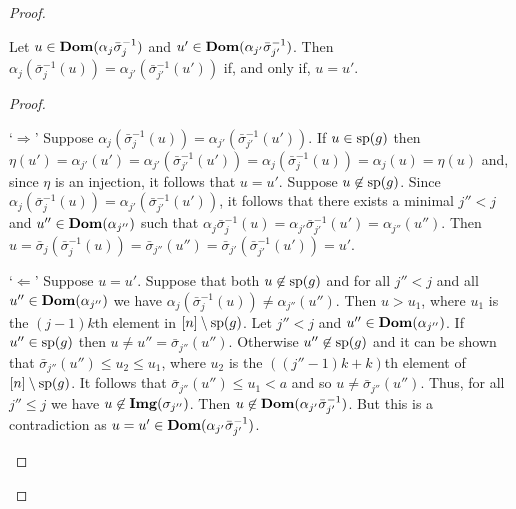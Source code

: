 \documentclass[../main/thesis.tex]{subfiles}
\begin{document}
\begin{proof}
  \begin{claim}
    Let $u \in \text{\textbf{Dom}}(\alpha_j \bar{\sigma}^{-1}_j)$ and $u' \in
    \text{\textbf{Dom}}(\alpha_{j'}\bar{\sigma}^{-1}_{j'})$. Then $\alpha_j
    (\bar{\sigma}^{-1}_j(u)) = \alpha_{j'}(\bar{\sigma}^{-1}_{j'}(u'))$ if, and
    only if, $u = u'$.
    \label{claim:compatibility}
  \end{claim}
  \begin{proof}
    \begin{myenum}
    \item[`$\Rightarrow$'] Suppose $\alpha_j (\bar{\sigma}^{-1}_j(u)) =
      \alpha_{j'}(\bar{\sigma}^{-1}_{j'}(u'))$. If $u \in \text{sp}(g)$ then
      $\eta(u') = \alpha_{j'}(u') = \alpha_{j'} (\bar{\sigma}^{-1}_{j'}(u')) =
      \alpha_j (\bar{\sigma}^{-1}_j(u)) = \alpha_j(u) = \eta (u)$ and, since
      $\eta$ is an injection, it follows that $u = u'$. Suppose $u \not\in
      \text{sp}(g)$. Since $\alpha_{j}(\bar{\sigma}^{-1}_{j}(u)) =
      \alpha_{j'}(\bar{\sigma}^{-1}_{j'}(u'))$, it follows that there exists a
      minimal $j'' < j$ and $u'' \in \text{\textbf{Dom}}(\alpha_{j''})$ such that $
      \alpha_{j}\bar{\sigma}^{-1}_{j}(u) = \alpha_{j'}
      \bar{\sigma}^{-1}_{j'}(u') = \alpha_{j''}(u'')$. Then $u =
      \bar{\sigma}_j(\bar{\sigma}^{-1}_j (u)) = \bar{\sigma}_{j''}(u'') =
      \bar{\sigma}_{j'}(\bar{\sigma}^{-1}_{j'} (u')) = u'$.

    \item[`$\Leftarrow$'] Suppose $u = u'$. Suppose that both $u \not\in
      \text{sp}(g)$ and for all $j'' < j$ and all $u'' \in \text{\textbf{Dom}}(\alpha_{j''})$ we
      have $\alpha_j(\bar{\sigma}^{-1}_j(u)) \neq \alpha_{j''}(u'')$. Then $u >
      u_1$, where $u_1$ is the $(j-1)k$th element in $[n] \setminus \text{sp}(g)$.
      Let $j'' < j$ and $u'' \in \text{\textbf{Dom}}(\alpha_{j''})$. If $u'' \in \text{sp}(g)$
      then $u \neq u'' = \bar{\sigma}_{j''}(u'')$. Otherwise $u'' \not\in
      \text{sp}(g)$ and it can be shown that $\bar{\sigma}_{j''}(u'') \leq u_2 \leq
      u_1$, where $u_2$ is the $((j'' - 1)k + k)$th element of $[n] \setminus
      \text{sp}(g)$. It follows that $\bar{\sigma}_{j''}(u'') \leq u_1< a$ and so
      $u \neq \bar{\sigma}_{j''}(u'')$. Thus, for all $j'' \leq j$ we have $u
      \not\in \text{\textbf{Img}}(\sigma_{j''})$. Then $u \not\in \text{\textbf{Dom}}(\alpha_{j'}
      \bar{\sigma}^{-1}_{j'})$. But this is a contradiction as $u = u' \in
      \text{\textbf{Dom}}(\alpha_{j'} \bar{\sigma}^{-1}_{j'})$.


\end{myenum}
\end{proof}
\end{proof}
\end{document}
